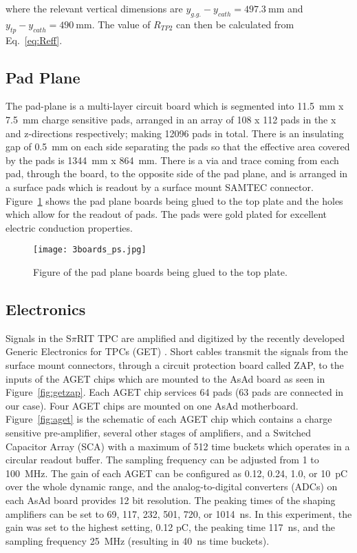 where the relevant vertical dimensions are $y_{g.g.} - y_{cath} = \SI{497.3}{\milli\metre}$ and $y_{tp} - y_{cath} = \SI{490}{\milli\metre}$. The value of $R_{TP2}$ can then be calculated from Eq.~\ref{eq:Reff}.


\subsection{Pad Plane}
The pad-plane is a multi-layer circuit board which is segmented into \SI{11.5}{\milli\metre} x \SI{7.5}{\milli\metre} charge sensitive pads, arranged in an array of 108 x 112 pads in the x and z-directions respectively; making 12096 pads in total. There is an insulating gap of \SI{0.5}{\milli\metre} on each side separating the pads so that the effective area covered by the pads is \SI{1344}{\milli\metre} x \SI{864}{\milli\metre}. There is a via and trace coming from each pad, through the board, to the opposite side of the pad plane, and is arranged in a surface pads which is readout by a surface mount SAMTEC connector. Figure~\ref{fig:padplane} shows the pad plane boards being glued to the top plate and the holes which allow for the readout of pads. The pads were gold plated for excellent electric conduction properties. 

\begin{figure}[!htb]
\centering
\texttt{[image: 3boards\_ps.jpg]}
\caption{Figure of the pad plane boards being glued to the top plate. }
\label{fig:padplane}
\end{figure}


\subsection{Electronics}

Signals in the S$\pi$RIT TPC are amplified and digitized by the recently developed Generic Electronics for TPCs (GET) \cite{get}.  Short cables transmit the signals from the surface mount connectors, through a circuit protection board called ZAP, to the inputs of the AGET chips which are mounted to the AsAd board as seen in Figure~\ref{fig:getzap}. Each AGET chip services 64 pads (63 pads are connected in our case). Four AGET chips are mounted on one AsAd  motherboard. Figure~\ref{fig:aget} is the schematic of each  AGET chip which contains a charge sensitive pre-amplifier, several other stages of amplifiers, and a Switched Capacitor Array (SCA) with a maximum of 512 time buckets which operates in a circular readout buffer. The sampling frequency can be adjusted from 1 to \SI{100}{\mega\hertz}. The gain of each AGET can be configured as 0.12, 0.24, 1.0, or \SI{10}{\pico\coulomb} over the whole dynamic range, and the analog-to-digital converters (ADCs) on each AsAd board provides 12 bit resolution. The peaking times of the shaping amplifiers can be set to 69, 117, 232, 501, 720, or \SI{1014}{\nano\second}. In this experiment, the gain was set to the highest setting, 0.12 \si{\pico\coulomb}, the peaking time \SI{117}{\nano\second}, and the sampling frequency \SI{25}{\mega\hertz} (resulting in \SI{40}{\nano\second} time buckets). 

